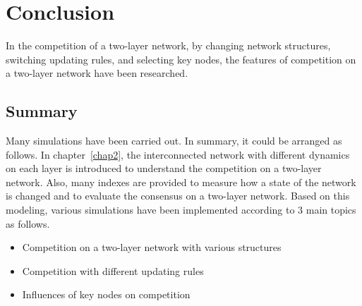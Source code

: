 
\chapter{Conclusion}
\label{chap6}
In the competition of a two-layer network, by changing network structures, switching updating rules, and selecting key nodes, the features of competition on a two-layer network have been researched.\\
 
\section{Summary}
Many simulations have been carried out. In summary, it could be arranged as follows. 
In chapter~\ref{chap2}, the interconnected network with different dynamics on each layer is introduced to understand the competition on a two-layer network.  Also, many indexes are provided to measure how a state of the network is changed and to evaluate the consensus on a two-layer network. Based on this modeling, various simulations have been implemented according to 3 main topics as follows.

\begin{itemize}
\item Competition on a two-layer network with various structures
\item Competition with different updating rules
\item Influences of key nodes on competition
\end{itemize}

